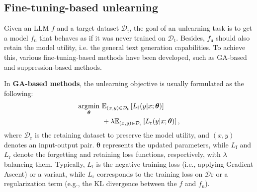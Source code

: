 \subsection{Fine-tuning-based unlearning}



Given an LLM $f$ and a target dataset $\mathcal{D}_{\mathrm{t}}$, the goal of an unlearning task is to get a model $f_{\mathrm{u}}$ that behaves as if it was never trained on $\mathcal{D}_{\mathrm{t}}$. Besides, $f_{\mathrm{u}}$ should also retain the model utility, i.e. the general text generation capabilities. {To achieve this, various fine-tuning-based methods have been developed, such as GA-based and suppression-based methods.}

In \textbf{GA-based methods}, the unlearning objective is usually formulated as the following: \vspace{-0.05in}
\begin{align}
    \underset{\boldsymbol{\theta}}{\operatorname{argmin}} ~ & \mathbb{E}_{(x, y) \in \mathcal{D}_{\mathrm{t}}}\left[L_{\mathrm{f}}(y | x ; \boldsymbol{\theta})\right] \notag \\
    &+ \lambda  \mathbb{E}_{(x, y) \in \mathcal{D}_{\mathrm{r}}}\left[L_{\mathrm{r}}(y | x ; \boldsymbol{\theta})\right],
    \label{eq:ga}
\end{align}
where $\mathcal{D}_{\mathrm{r}}$ is the retaining dataset to preserve the model utility, and $(x, y)$ denotes an input-output pair. $\boldsymbol{\theta}$ represents the updated parameters, while $L_{\mathrm{f}}$ and $L_{\mathrm{r}}$ denote the forgetting and retaining loss functions, respectively, with $\lambda$ balancing them. Typically, $L_{\mathrm{f}}$ is the negative training loss (i.e., applying Gradient Ascent) or a variant, while $L_{\mathrm{r}}$ corresponds to the training loss on $\mathcal{D}{\mathrm{r}}$ or a regularization term (e.g., the KL divergence between the $f$ and $f_{\mathrm{u}}$). 


